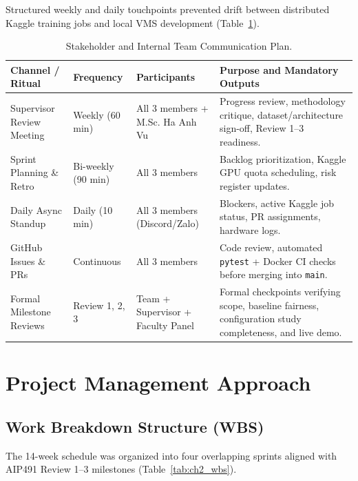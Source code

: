 Structured weekly and daily touchpoints prevented drift between distributed Kaggle training jobs and local VMS development (Table~\ref{tab:ch2_comm_plan}).

\begin{table}[H]
\centering
\caption{Stakeholder and Internal Team Communication Plan.}
\label{tab:ch2_comm_plan}
\footnotesize
\renewcommand{\arraystretch}{1.10}
\begin{tabularx}{\textwidth}{|>{\raggedright\arraybackslash}p{3.0cm}|>{\raggedright\arraybackslash}p{2.2cm}|>{\raggedright\arraybackslash}p{2.6cm}|>{\raggedright\arraybackslash}X|}
\hline
\rowcolor{slatehdr}
\textbf{Channel / Ritual} & \textbf{Frequency} & \textbf{Participants} & \textbf{Purpose and Mandatory Outputs} \\
\hline
Supervisor Review Meeting & Weekly (60 min) & All 3 members + M.Sc. Ha Anh Vu & Progress review, methodology critique, dataset/architecture sign-off, Review 1--3 readiness. \\
\hline
Sprint Planning \& Retro & Bi-weekly (90 min) & All 3 members & Backlog prioritization, Kaggle GPU quota scheduling, risk register updates. \\
\hline
Daily Async Standup & Daily (10 min) & All 3 members (Discord/Zalo) & Blockers, active Kaggle job status, PR assignments, hardware logs. \\
\hline
GitHub Issues \& PRs & Continuous & All 3 members & Code review, automated \texttt{pytest} + Docker CI checks before merging into \texttt{main}. \\
\hline
Formal Milestone Reviews & Review 1, 2, 3 & Team + Supervisor + Faculty Panel & Formal checkpoints verifying scope, baseline fairness, configuration study completeness, and live demo. \\
\hline
\end{tabularx}
\end{table}

\section{Project Management Approach}

\subsection{Work Breakdown Structure (WBS)}

The 14-week schedule was organized into four overlapping sprints aligned with AIP491 Review 1--3 milestones (Table~\ref{tab:ch2_wbs}).


